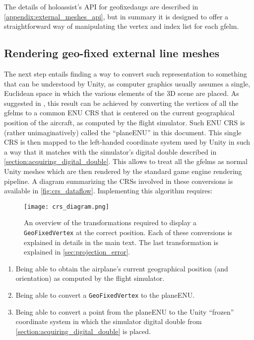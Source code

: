 The details of \gls{holoassist}'s \gls{API} for \glspl{geofixedaug} are described in \autoref{appendix:external_meshes_api}, but in summary it is designed to offer a straightforward way of manipulating the vertex and index list for each \gls{gfelm}.

\subsection{Rendering geo-fixed external line meshes}\label{sec:renderling_elm}

The next step entails finding a way to convert such representation to something that can be understood by Unity, as computer graphics usually assumes a single, Euclidean space in which the various elements of the 3D scene are placed. As suggested in \cite{zintl_design_2020}, this result can be achieved by converting the vertices of all the \glspl{gfelm} to a common \gls{ENU} \acrlong{CRS} that is centered on the current geographical position of the aircraft, as computed by the flight simulator. Such \gls{ENU} \gls{CRS} is (rather unimaginatively) called the \enquote{\gls{planeENU}} in this document. This single \gls{CRS} is then mapped to the left-handed coordinate system used by Unity in such a way that it matches with the simulator's digital double described in \autoref{section:acquiring_digital_double}. This allows to treat all the \glspl{gfelm} as normal Unity meshes which are then rendered by the standard game engine rendering pipeline. A diagram summarizing the \glspl{CRS} involved in these conversions is available in \autoref{fig:crs_dataflow}. Implementing this algorithm requires:

\begin{figure}[p]
  \centering
  \texttt{[image: crs\_diagram.png]}
  \caption{An overview of the transformations required to display a \texttt{GeoFixedVertex} at the correct position. Each of these conversions is explained in details in the main text. The last transformation is explained in \autoref{sec:projection_error}.}\label{fig:crs_dataflow}
\end{figure}

\begin{enumerate}
    \item Being able to obtain the airplane's current geographical position (and orientation) as computed by the flight simulator.
    \item Being able to convert a \texttt{GeoFixedVertex} to the \gls{planeENU}.
    \item Being able to convert a point from the \gls{planeENU} to the Unity \enquote{frozen} coordinate system in which the simulator digital double from \autoref{section:acquiring_digital_double} is placed.
\end{enumerate}

